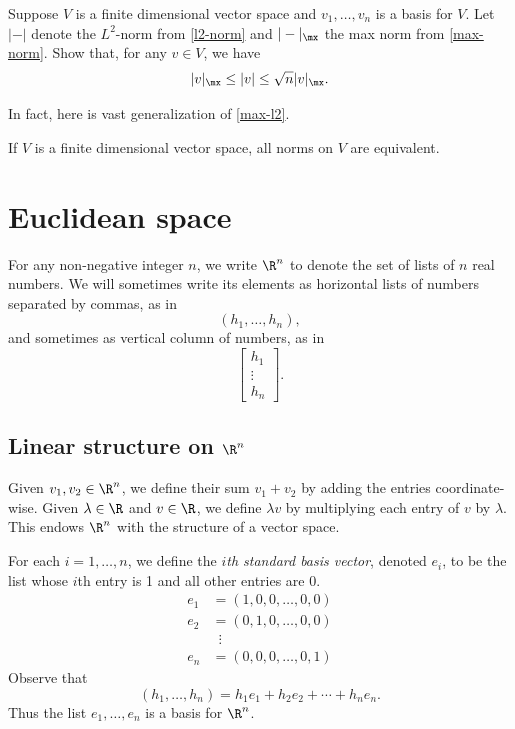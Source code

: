 \begin{exercise} \label{max-l2}
	Suppose $V$ is a finite dimensional vector space and $v_1, \dotsc, v_n$ is a basis for $V$. Let $|-|$ denote the $L^2$-norm from \cref{l2-norm} and $|-|_\mx$ the max norm from \cref{max-norm}. Show that, for any $v \in V$, we have
	\[ |v|_\mx \leq |v| \leq \sqrt{n} |v|_\mx. \]
\end{exercise} 

In fact, here is vast generalization of \cref{max-l2}. 

\begin{theorem} \label{finite-dim-norm}
	If $V$ is a finite dimensional vector space, all norms on $V$ are equivalent.
\end{theorem}

\section{Euclidean space} \label{euclidean}

For any non-negative integer $n$, we write $\R^n$ to denote the set of lists of $n$ real numbers. We will sometimes write its elements as horizontal lists of numbers separated by commas, as in \[ (h_1, \dotsc, h_n), \] and sometimes as vertical column of numbers, as in \[ \begin{bmatrix} h_1 \\ \vdots \\ h_n \end{bmatrix}.  \]

\subsection{Linear structure on \texorpdfstring{$\R^n$}{Rn}}

Given $v_1, v_2 \in \R^n$, we define their sum $v_1 + v_2$ by adding the entries coordinate-wise. Given $\lambda \in \R$ and $v \in \R$, we define $\lambda v$ by multiplying each entry of $v$ by $\lambda$. This endows $\R^n$ with the structure of a vector space. 

For each $i = 1,  \dotsc, n$, we define the \emph{$i$th standard basis vector}, denoted $e_i$, to be the list whose $i$th entry is 1 and all other entries are 0. 
\[ \begin{aligned} e_1 &= (1, 0, 0, \dotsc, 0, 0) \\
e_2 &= (0, 1, 0, \dotsc, 0, 0) \\
&\enspace \vdots \\
e_n &= (0, 0, 0, \dotsc, 0, 1) \end{aligned} \]
Observe that
\[ (h_1, \dotsc, h_n) = h_1 e_1 + h_2 e_2 + \dotsb + h_n e_n.  \]
Thus the list $e_1, \dotsc, e_n$ is a basis for $\R^n$. 

